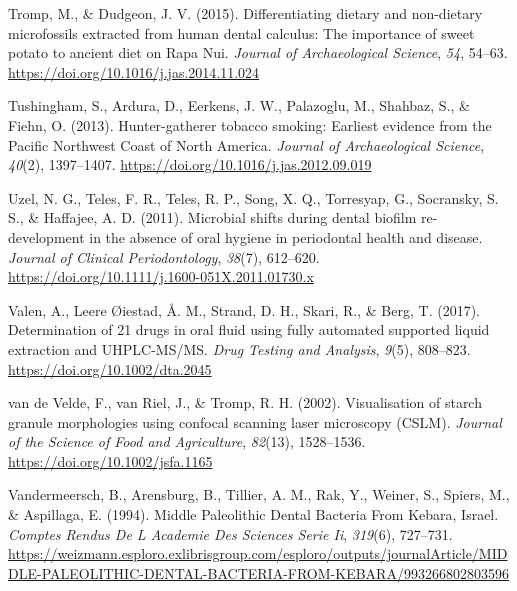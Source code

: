 \documentclass[
  letterpaper,
]{book}
\newlength{\cslhangindent}
\newlength{\cslentryspacingunit} %
\newenvironment{CSLReferences}[2] %
 {%
  \setlength{\parindent}{0pt}
  \ifodd #1
  \let\oldpar\par
  \def\par{\hangindent=\cslhangindent\oldpar}
  \fi
  \setlength{\parskip}{#2\cslentryspacingunit}
 }%
 {}
\begin{document}
\begin{CSLReferences}{1}{0}
\leavevmode{}%
Tromp, M., \& Dudgeon, J. V. (2015). Differentiating dietary and
non-dietary microfossils extracted from human dental calculus: The
importance of sweet potato to ancient diet on {Rapa Nui}. \emph{Journal
of Archaeological Science}, \emph{54}, 54--63.
\url{https://doi.org/10.1016/j.jas.2014.11.024}

\leavevmode{}%
Tushingham, S., Ardura, D., Eerkens, J. W., Palazoglu, M., Shahbaz, S.,
\& Fiehn, O. (2013). Hunter-gatherer tobacco smoking: Earliest evidence
from the {Pacific Northwest Coast} of {North America}. \emph{Journal of
Archaeological Science}, \emph{40}(2), 1397--1407.
\url{https://doi.org/10.1016/j.jas.2012.09.019}

\leavevmode{}%
Uzel, N. G., Teles, F. R., Teles, R. P., Song, X. Q., Torresyap, G.,
Socransky, S. S., \& Haffajee, A. D. (2011). Microbial shifts during
dental biofilm re-development in the absence of oral hygiene in
periodontal health and disease. \emph{Journal of Clinical
Periodontology}, \emph{38}(7), 612--620.
\url{https://doi.org/10.1111/j.1600-051X.2011.01730.x}

\leavevmode{}%
Valen, A., Leere Øiestad, Å. M., Strand, D. H., Skari, R., \& Berg, T.
(2017). Determination of 21 drugs in oral fluid using fully automated
supported liquid extraction and {UHPLC-MS}/{MS}. \emph{Drug Testing and
Analysis}, \emph{9}(5), 808--823. \url{https://doi.org/10.1002/dta.2045}

\leavevmode{}%
van de Velde, F., van Riel, J., \& Tromp, R. H. (2002). Visualisation of
starch granule morphologies using confocal scanning laser microscopy
({CSLM}). \emph{Journal of the Science of Food and Agriculture},
\emph{82}(13), 1528--1536. \url{https://doi.org/10.1002/jsfa.1165}

\leavevmode{}%
Vandermeersch, B., Arensburg, B., Tillier, A. M., Rak, Y., Weiner, S.,
Spiers, M., \& Aspillaga, E. (1994). Middle {Paleolithic Dental Bacteria
From Kebara}, {Israel}. \emph{Comptes Rendus De L Academie Des Sciences
Serie Ii}, \emph{319}(6), 727--731.
\url{https://weizmann.esploro.exlibrisgroup.com/esploro/outputs/journalArticle/MIDDLE-PALEOLITHIC-DENTAL-BACTERIA-FROM-KEBARA/993266802803596}


\end{CSLReferences}
\end{document}
